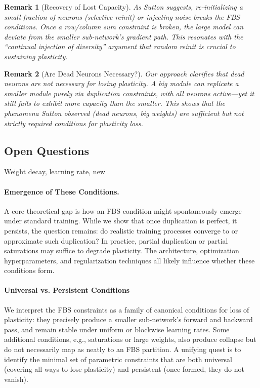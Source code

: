 \documentclass[11pt]{article}
\newtheorem{remark}{Remark}[section]
\begin{document}
\begin{remark}[Recovery of Lost Capacity]
As Sutton suggests, re-initializing a small fraction of neurons (selective reinit) or injecting noise breaks the FBS conditions. Once a row/column sum constraint is broken, the large model can deviate from the smaller sub-network's gradient path. This resonates with the ``continual injection of diversity'' argument that random reinit is crucial to sustaining plasticity.
\end{remark}

\begin{remark}[Are Dead Neurons Necessary?]
Our approach clarifies that dead neurons are not necessary for losing plasticity. A big module can replicate a smaller module purely via duplication constraints, with all neurons active---yet it still fails to exhibit more capacity than the smaller. This shows that the phenomena Sutton observed (dead neurons, big weights) are sufficient but not strictly required conditions for plasticity loss.
\end{remark}

\subsection{Open Questions}

Weight decay, learning rate, new 

\paragraph{Emergence of These Conditions.} A core theoretical gap is how an FBS condition might spontaneously emerge under standard training. While we show that once duplication is perfect, it persists, the question remains: do realistic training processes converge to or approximate such duplication? In practice, partial duplication or partial saturations may suffice to degrade plasticity. The architecture, optimization hyperparameters, and regularization techniques all likely influence whether these conditions form.

\paragraph{Universal vs. Persistent Conditions} We interpret the FBS constraints as a family of canonical conditions for loss of plasticity: they precisely produce a smaller sub-network's forward and backward pass, and remain stable under uniform or blockwise learning rates. Some additional conditions, e.g., saturations or large weights, also produce collapse but do not necessarily map as neatly to an FBS partition. A unifying quest is to identify the minimal set of parametric constraints that are both universal (covering all ways to lose plasticity) and persistent (once formed, they do not vanish).
\end{document}
